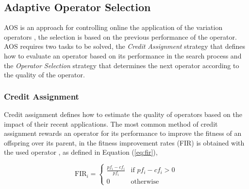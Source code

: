 \documentclass[journal]{IEEEtran}
\begin{document}
\subsection{Adaptive Operator Selection}
AOS is an approach for controlling online the application of the variation operators \cite{hitomi2016classification}, the selection is based on the previous performance of the operator.
AOS requires two tasks to be solved, the \textit{Credit Assignment} strategy that defines how to evaluate an operator based on its performance in the search process and the \textit{Operator Selection} strategy that determines the next operator according to the quality of the operator.

\subsubsection{Credit Assignment}
Credit assignment defines how to estimate the quality of operators based on the impact of their recent applications.
The most common method of credit assignment rewards an operator for its performance to improve the fitness of an offspring over its parent, in \cite{lin2016adaptive} the fitness improvement rates (FIR) is obtained with the used operator
, as defined in Equation (\ref{eq:fir}),

\begin{equation}
  \text{FIR}_{i}=\left\{
  \begin{array}{ll}
    \frac{pf_{i}-cf_{i}}{pf_{i}} & \text{if }pf_{i}-cf_{i}>0 \\

    0                            & \text{otherwise}
  \end{array}
  \right.
  \label{eq:fir}
\end{equation}
\end{document}
